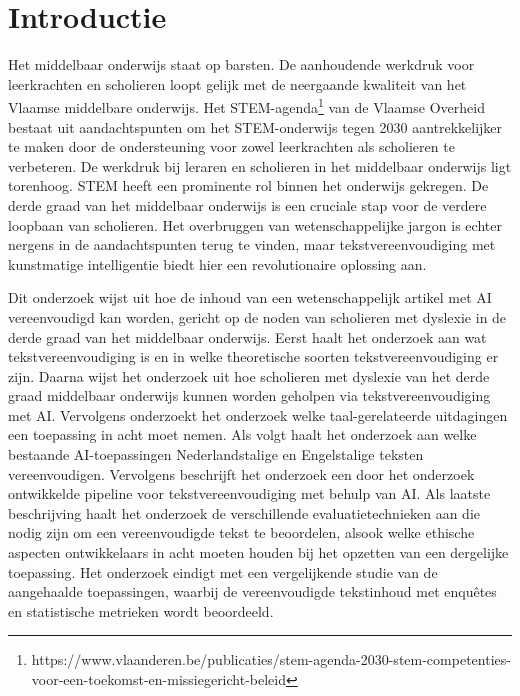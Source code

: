 
\section{Introductie}%
\label{sec:introductie}


Het middelbaar onderwijs staat op barsten. De aanhoudende werkdruk voor leerkrachten en scholieren loopt gelijk met de neergaande kwaliteit van het Vlaamse middelbare onderwijs. Het STEM-agenda\footnote{https://www.vlaanderen.be/publicaties/stem-agenda-2030-stem-competenties-voor-een-toekomst-en-missiegericht-beleid} van de Vlaamse Overheid bestaat uit aandachtspunten om het STEM-onderwijs tegen 2030 aantrekkelijker te maken door de ondersteuning voor zowel leerkrachten als scholieren te verbeteren. De werkdruk bij leraren en scholieren in het middelbaar onderwijs ligt torenhoog. STEM heeft een prominente rol binnen het onderwijs gekregen. De derde graad van het middelbaar onderwijs is een cruciale stap voor de verdere loopbaan van scholieren. Het overbruggen van wetenschappelijke jargon is echter nergens in de aandachtspunten terug te vinden, maar tekstvereenvoudiging met kunstmatige intelligentie biedt hier een revolutionaire oplossing aan.

Dit onderzoek wijst uit hoe de inhoud van een wetenschappelijk artikel met AI vereenvoudigd kan worden, gericht op de noden van scholieren met dyslexie in de derde graad van het middelbaar onderwijs. Eerst haalt het onderzoek aan wat tekstvereenvoudiging is en in welke theoretische soorten tekstvereenvoudiging er zijn. Daarna wijst het onderzoek uit hoe scholieren met dyslexie van het derde graad middelbaar onderwijs kunnen worden geholpen via tekstvereenvoudiging met AI. Vervolgens onderzoekt het onderzoek welke taal-gerelateerde uitdagingen een toepassing in acht moet nemen. Als volgt haalt het onderzoek aan welke bestaande AI-toepassingen Nederlandstalige en Engelstalige teksten vereenvoudigen. Vervolgens beschrijft het onderzoek een door het onderzoek ontwikkelde pipeline voor tekstvereenvoudiging met behulp van AI. Als laatste beschrijving haalt het onderzoek de verschillende evaluatietechnieken aan die nodig zijn om een vereenvoudigde tekst te beoordelen, alsook welke ethische aspecten ontwikkelaars in acht moeten houden bij het opzetten van een dergelijke toepassing. Het onderzoek eindigt met een vergelijkende studie van de aangehaalde toepassingen, waarbij de vereenvoudigde tekstinhoud met enquêtes en statistische metrieken wordt beoordeeld.

